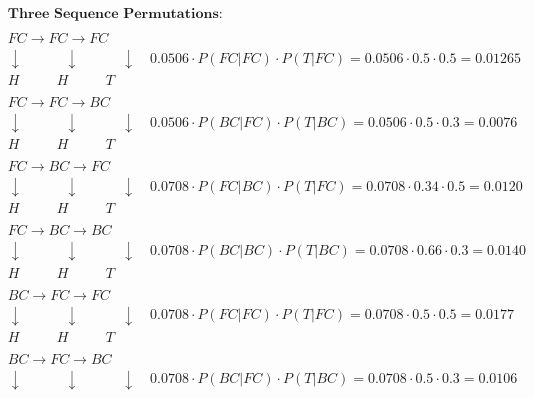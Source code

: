 \documentclass[a4paper]{article}
\begin{document}
\begin{sloppypar}
\begin{enumerate}[start=6,label=Q\arabic*,left=0pt]
    \begin{align*}
        & \textbf{Three Sequence Permutations}: \\\\
        & FC \rightarrow FC \rightarrow FC \\
        & \downarrow \quad \quad \quad \downarrow \quad \quad \quad \downarrow \quad 0.0506 \cdot P(FC | FC) \cdot P(T | FC) = 0.0506 \cdot 0.5 \cdot 0.5 = 0.01265 \\
        & H \quad \quad \:\:\: H \quad \quad \:\:\: T \\\\
        & FC \rightarrow FC \rightarrow BC \\
        & \downarrow \quad \quad \quad \downarrow \quad \quad \quad \downarrow \quad 0.0506 \cdot P(BC | FC) \cdot P(T | BC) = 0.0506 \cdot 0.5 \cdot 0.3 = 0.0076 \\
        & H \quad \quad \:\:\: H \quad \quad \:\:\: T \\\\
        & FC \rightarrow BC \rightarrow FC \\
        & \downarrow \quad \quad \quad \downarrow \quad \quad \quad \downarrow \quad 0.0708 \cdot P(FC | BC) \cdot P(T | FC) = 0.0708 \cdot 0.34 \cdot 0.5 = 0.0120 \\
        & H \quad \quad \:\:\: H \quad \quad \:\:\:T \\\\
        & FC \rightarrow BC \rightarrow BC \\
        & \downarrow \quad \quad \quad \downarrow \quad \quad \quad \downarrow \quad 0.0708 \cdot P(BC | BC) \cdot P(T | BC) = 0.0708 \cdot 0.66 \cdot 0.3 = 0.0140 \\
        & H \quad \quad \:\:\: H \quad \quad \:\:\: T \\\\
        & BC \rightarrow FC \rightarrow FC \\
        & \downarrow \quad \quad \quad \downarrow \quad \quad \quad \downarrow \quad 0.0708 \cdot P(FC | FC) \cdot P(T | FC) = 0.0708 \cdot 0.5 \cdot 0.5 = 0.0177 \\
        & H \quad \quad \:\:\: H \quad \quad \:\:\: T \\\\
        & BC \rightarrow FC \rightarrow BC \\
        & \downarrow \quad \quad \quad \downarrow \quad \quad \quad \downarrow \quad 0.0708 \cdot P(BC | FC) \cdot P(T | BC) = 0.0708 \cdot 0.5 \cdot 0.3 = 0.0106 \\

\end{align*}
\end{enumerate}
\end{sloppypar}
\end{document}
